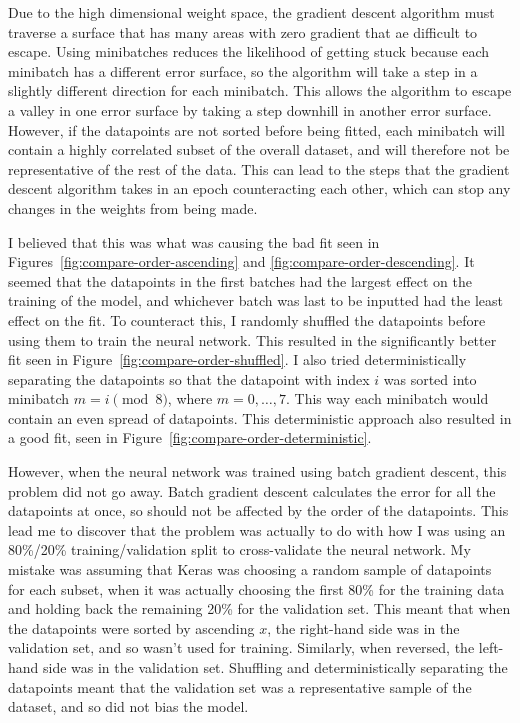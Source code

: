 Due to the high dimensional weight space, the gradient descent algorithm must traverse a surface that has many areas with zero gradient that ae difficult to escape.
Using minibatches reduces the likelihood of getting stuck because each minibatch has a different error surface, so the algorithm will take a step in a slightly different direction for each minibatch.
This allows the algorithm to escape a valley in one error surface by taking a step downhill in another error surface.
However, if the datapoints are not sorted before being fitted, each minibatch will contain a highly correlated subset of the overall dataset, and will therefore not be representative of the rest of the data.
This can lead to the steps that the gradient descent algorithm takes in an epoch counteracting each other, which can stop any changes in the weights from being made.

I believed that this was what was causing the bad fit seen in Figures~\ref{fig:compare-order-ascending} and \ref{fig:compare-order-descending}.
It seemed that the datapoints in the first batches had the largest effect on the training of the model, and whichever batch was last to be inputted had the least effect on the fit.
To counteract this, I randomly shuffled the datapoints before using them to train the neural network.
This resulted in the significantly better fit seen in Figure~\ref{fig:compare-order-shuffled}.
I also tried deterministically separating the datapoints so that the datapoint with index \(i\) was sorted into minibatch \(m = i \pmod 8\), where \(m = 0, \dots, 7\).
This way each minibatch would contain an even spread of datapoints.
This deterministic approach also resulted in a good fit, seen in Figure~\ref{fig:compare-order-deterministic}.

However, when the neural network was trained using batch gradient descent, this problem did not go away.
Batch gradient descent calculates the error for all the datapoints at once, so should not be affected by the order of the datapoints.
This lead me to discover that the problem was actually to do with how I was using an 80\%/20\% training/validation split to cross-validate the neural network.
My mistake was assuming that Keras was choosing a random sample of datapoints for each subset, when it was actually choosing the first 80\% for the training data and holding back the remaining 20\% for the validation set.
This meant that when the datapoints were sorted by ascending \(x\), the right-hand side was in the validation set, and so wasn't used for training.
Similarly, when reversed, the left-hand side was in the validation set.
Shuffling and deterministically separating the datapoints meant that the validation set was a representative sample of the dataset, and so did not bias the model.

